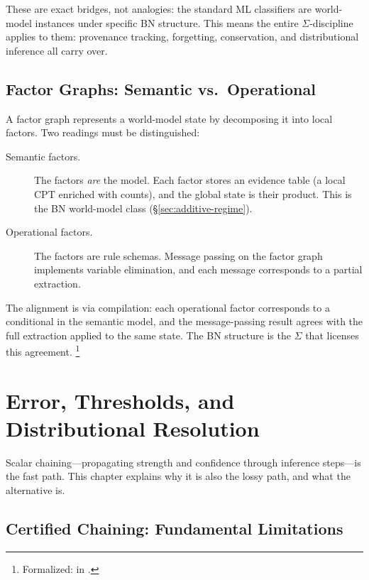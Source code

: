 \documentclass[11pt,openany]{report}
\begin{document}
\noindent
These are exact bridges, not analogies: the standard ML classifiers
are world-model instances under specific BN structure.  This means
the entire $\Sigma$-discipline applies to them: provenance tracking,
forgetting, conservation, and distributional inference all carry
over.


\section{Factor Graphs: Semantic vs.\ Operational}

A factor graph represents a world-model state by decomposing it into
local factors.  Two readings must be distinguished:

\begin{description}
\item[Semantic factors.] The factors \emph{are} the model.  Each factor
  stores an evidence table (a local CPT enriched with counts), and the
  global state is their product.  This is the BN world-model class
  (\S\ref{sec:additive-regime}).

\item[Operational factors.] The factors are rule schemas.  Message
  passing on the factor graph implements variable elimination, and each
  message corresponds to a partial extraction.
\end{description}

\noindent
The alignment is via compilation: each operational factor corresponds
to a conditional in the semantic model, and the message-passing result
agrees with the full extraction applied to the same state.  The BN
structure is the $\Sigma$ that licenses this agreement.%
\footnote{Formalized:
 in
.}


\chapter{Error, Thresholds, and Distributional Resolution}
\label{ch:error-transport}

Scalar chaining---propagating strength and confidence through
inference steps---is the fast path.  This chapter explains why it
is also the lossy path, and what the alternative is.

\section{Certified Chaining: Fundamental Limitations}
\end{document}
